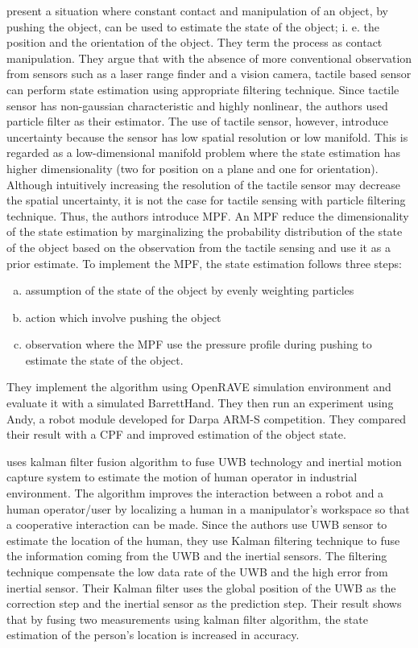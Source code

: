 \textcite{Koval2013} present a situation where constant contact and manipulation of an
object, by pushing the object, can be used to estimate the state of the object; i. e. the position
and the orientation of the object. They term the process as contact manipulation. They argue
that with the absence of more conventional observation from sensors such as a laser range
finder and a vision camera, tactile based sensor can perform state estimation using appropriate
filtering technique. Since tactile sensor has non-gaussian characteristic and highly nonlinear,
the authors used particle filter as their estimator. The use of tactile sensor, however, introduce
uncertainty because the sensor has low spatial resolution or low manifold. This is regarded as a
low-dimensional manifold problem where the state estimation has higher dimensionality (two for
position on a plane and one for orientation). Although intuitively increasing the resolution of the
tactile sensor may decrease the spatial uncertainty, it is not the case for tactile sensing with
particle filtering technique. Thus, the authors introduce \acrfull{MPF}. An MPF
reduce the dimensionality of the state estimation by marginalizing the probability distribution of
the state of the object based on the observation from the tactile sensing and use it as a prior
estimate. To implement the MPF, the state estimation follows three steps:

\begin{enumerate}[(a)]
  \item assumption of the state of the object by evenly weighting particles
  \item action which involve pushing the object
  \item observation where the MPF use the pressure profile during pushing to estimate the
state of the object.
\end{enumerate}

They implement the algorithm using OpenRAVE simulation environment and evaluate it with a
simulated BarrettHand. They then run an experiment using Andy, a robot module developed for
Darpa ARM-S competition. They compared their result with a
\acrfull{CPF}
and improved estimation of the object state.

\textcite{Corrales2008} uses kalman filter fusion algorithm to fuse \acrfull{UWB}
technology and inertial motion capture system to estimate the motion of human operator in
industrial environment. The algorithm improves the interaction between a robot and a human
operator/user by localizing a human in a manipulator's workspace so that a cooperative
interaction can be made. Since the authors use UWB sensor to estimate the location of the
human, they use Kalman filtering technique to fuse the information coming from the UWB and
the inertial sensors. The filtering technique compensate the low data rate of the UWB and the
high error from inertial sensor. Their Kalman filter uses the global position of the UWB as the
correction step and the inertial sensor as the prediction step. Their result shows that by fusing
two measurements using kalman filter algorithm, the state estimation of the person's location is
increased in accuracy.

